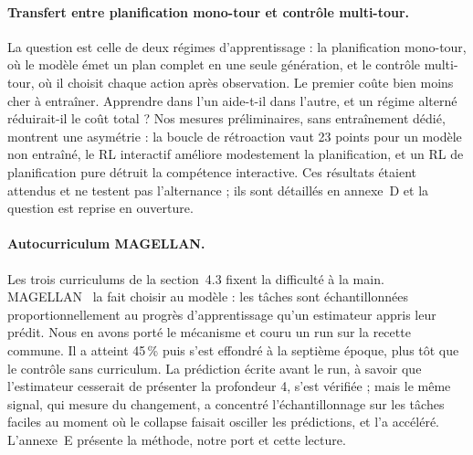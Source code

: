 \documentclass[11pt,a4paper]{article}
\begin{document}
\paragraph{Transfert entre planification mono-tour et contrôle multi-tour.} La question est celle de deux régimes d'apprentissage : la planification mono-tour, où le modèle émet un plan complet en une seule génération, et le contrôle multi-tour, où il choisit chaque action après observation. Le premier coûte bien moins cher à entraîner. Apprendre dans l'un aide-t-il dans l'autre, et un régime alterné réduirait-il le coût total ? Nos mesures préliminaires, sans entraînement dédié, montrent une asymétrie : la boucle de rétroaction vaut 23 points pour un modèle non entraîné, le RL interactif améliore modestement la planification, et un RL de planification pure détruit la compétence interactive. Ces résultats étaient attendus et ne testent pas l'alternance ; ils sont détaillés en annexe~D et la question est reprise en ouverture.

\paragraph{Autocurriculum MAGELLAN.} Les trois curriculums de la section~4.3 fixent la difficulté à la main. MAGELLAN~\cite{gaven2025magellan} la fait choisir au modèle : les tâches sont échantillonnées proportionnellement au progrès d'apprentissage qu'un estimateur appris leur prédit. Nous en avons porté le mécanisme et couru un run sur la recette commune. Il a atteint 45\,\% puis s'est effondré à la septième époque, plus tôt que le contrôle sans curriculum. La prédiction écrite avant le run, à savoir que l'estimateur cesserait de présenter la profondeur 4, s'est vérifiée ; mais le même signal, qui mesure du changement, a concentré l'échantillonnage sur les tâches faciles au moment où le collapse faisait osciller les prédictions, et l'a accéléré. L'annexe~E présente la méthode, notre port et cette lecture.
\end{document}
